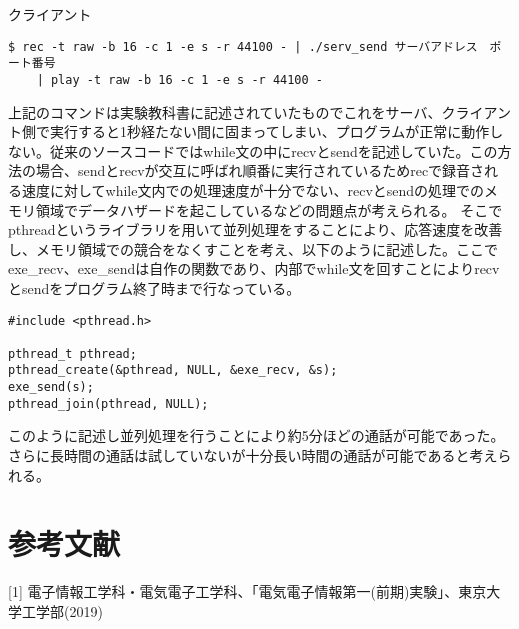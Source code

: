 \documentclass{jsarticle}
\begin{document}
クライアント
\begin{lstlisting}[basicstyle=\ttfamily\footnotesize, frame=single]
$ rec -t raw -b 16 -c 1 -e s -r 44100 - | ./serv_send サーバアドレス　ポート番号
	| play -t raw -b 16 -c 1 -e s -r 44100 -
\end{lstlisting}

上記のコマンドは実験教科書に記述されていたものでこれをサーバ、クライアント側で実行すると1秒経たない間に固まってしまい、プログラムが正常に動作しない。従来のソースコードではwhile文の中にrecvとsendを記述していた。この方法の場合、sendとrecvが交互に呼ばれ順番に実行されているためrecで録音される速度に対してwhile文内での処理速度が十分でない、recvとsendの処理でのメモリ領域でデータハザードを起こしているなどの問題点が考えられる。
そこでpthreadというライブラリを用いて並列処理をすることにより、応答速度を改善し、メモリ領域での競合をなくすことを考え、以下のように記述した。ここでexe\_recv、exe\_sendは自作の関数であり、内部でwhile文を回すことによりrecvとsendをプログラム終了時まで行なっている。

\begin{lstlisting}[basicstyle=\ttfamily\footnotesize, frame=single]
#include <pthread.h>

pthread_t pthread;
pthread_create(&pthread, NULL, &exe_recv, &s);
exe_send(s);
pthread_join(pthread, NULL);
\end{lstlisting}

このように記述し並列処理を行うことにより約5分ほどの通話が可能であった。さらに長時間の通話は試していないが十分長い時間の通話が可能であると考えられる。

\section{参考文献}
[1] 電子情報工学科・電気電子工学科、「電気電子情報第一(前期)実験」、東京大学工学部(2019)
\\
\end{document}
